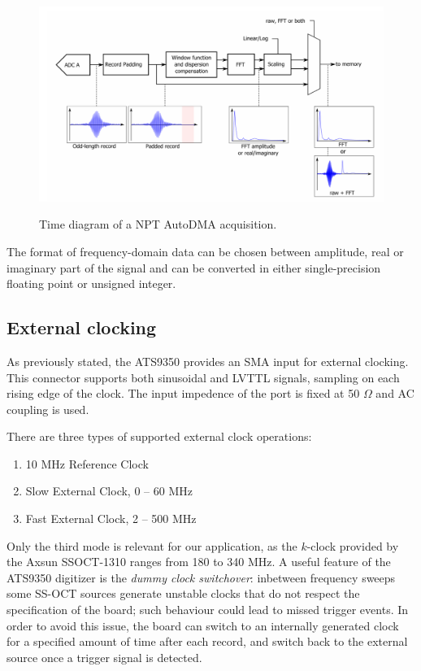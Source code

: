     \begin{figure}[bth]
    	\myfloatalign
    	{\includegraphics[width=.95\linewidth]{gfx/ch3/fft-module}}
    	\caption{Time diagram of a NPT AutoDMA acquisition.}\label{fig:fft-module}
    \end{figure}
    
    The format of frequency-domain data can be chosen between amplitude, real or imaginary part of the signal and can be converted in either single-precision floating point or unsigned integer. 
    
    \subsection{External clocking}
    As previously stated, the ATS9350 provides an SMA input for external clocking. This connector supports both sinusoidal and \ac{LVTTL} signals, sampling on each rising edge of the clock. The input impedence of the port is fixed at 50 $\Omega$ and AC coupling is used.
    
    There are three types of supported external clock operations:
    \begin{enumerate}
    	\item 10 MHz Reference Clock
    	\item Slow External Clock, 0 -- 60 MHz
    	\item Fast External Clock, 2 -- 500 MHz
    \end{enumerate} 

	Only the third mode is relevant for our application, as the $k$-clock provided by the Axsun SSOCT-1310 ranges from 180 to 340 MHz. A useful feature of the ATS9350 digitizer is the \emph{dummy clock switchover}: inbetween frequency sweeps some SS-OCT sources generate unstable clocks that do not respect the specification of the board; such behaviour could lead to missed trigger events. In order to avoid this issue, the board can switch to an internally generated clock for a specified amount of time after each record, and switch back to the external source once a trigger signal is detected. 
	
